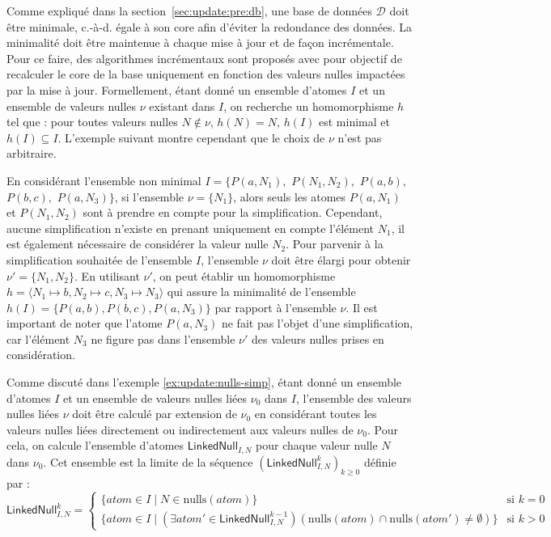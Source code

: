 Comme expliqué dans la section~\ref{sec:update:pre:db}, une base de données $\mathcal{D}$ doit être minimale, c.-à-d. égale à son \gls{core} afin d'éviter la redondance des données.
La minimalité doit être maintenue à chaque mise à jour et de façon incrémentale.
Pour ce faire, des algorithmes incrémentaux sont proposés avec pour objectif de recalculer le \gls{core}  de la base uniquement en fonction des valeurs nulles impactées par la mise à jour.
Formellement, étant donné un ensemble d'atomes $I$ et un ensemble de valeurs nulles $\nu$ existant dans $I$, on recherche un homomorphisme $h$ tel que : pour toutes valeurs nulles $N \notin \nu$, $h(N) = N$, $h(I)$ est minimal et $h(I) \subseteq I$.
L'exemple suivant montre cependant que le choix de $\nu$ n'est pas arbitraire.

\begin{example}
	\label{ex:update:nulls-simp}
	En considérant l'ensemble non minimal $I = \{P(a, N_1),$ $P(N_1, N_2),$ $P(a, b),$ $P(b, c),$ $P(a, N_3)\}$, si l'ensemble $\nu = \{N_1\}$, alors seuls les atomes $P(a, N_1)$ et $P(N_1, N_2)$ sont à prendre en compte pour la simplification.
	Cependant, aucune simplification n'existe en prenant uniquement en compte l'élément $N_1$, il est également nécessaire de considérer la valeur nulle $N_2$.
	Pour parvenir à la simplification souhaitée de l'ensemble $I$, l'ensemble $\nu$ doit être élargi pour obtenir $\nu' = \{N_1, N_2\}$.
	En utilisant $\nu'$, on peut établir un homomorphisme $h = \langle N_1 \mapsto b, N_2 \mapsto c, N_3 \mapsto N_3 \rangle$ qui assure la minimalité de l'ensemble $h(I) = \{P(a, b), P(b, c), P(a, N_3)\}$ par rapport à l'ensemble $\nu$.
	Il est important de noter que l'atome $P(a, N_3)$ ne fait pas l'objet d'une simplification, car l'élément $N_3$ ne figure pas dans l'ensemble $\nu'$ des valeurs nulles prises en considération.
\end{example}

Comme discuté dans l'exemple \ref{ex:update:nulls-simp}, étant donné un ensemble d'atomes $I$ et un ensemble de valeurs nulles liées $\nu_0$ dans $I$, l'ensemble des valeurs nulles liées $\nu$ doit être calculé par extension de $\nu_0$ en considérant toutes les valeurs nulles liées directement ou indirectement aux valeurs nulles de $\nu_0$.
Pour cela, on calcule l'ensemble d'atomes $\textsf{LinkedNull}_{I,N}$ pour chaque valeur nulle $N$ dans $\nu_0$.
Cet ensemble est la limite de la séquence $(\textsf{LinkedNull}^k_{I,N})_{k \ge 0}$ définie par :
\begin{equation*}
	\textsf{LinkedNull}^k_{I,N} =
	\begin{cases}
		\{atom \in I \mid N \in \text{nulls}(atom)\}                                                                                        & \text{si } k = 0 \\
		\{atom \in I \mid (\exists atom' \in \textsf{LinkedNull}^{k-1}_{I,N})(\text{nulls}(atom) \cap \text{nulls}(atom') \neq \emptyset)\} & \text{si } k > 0
	\end{cases}
\end{equation*}


